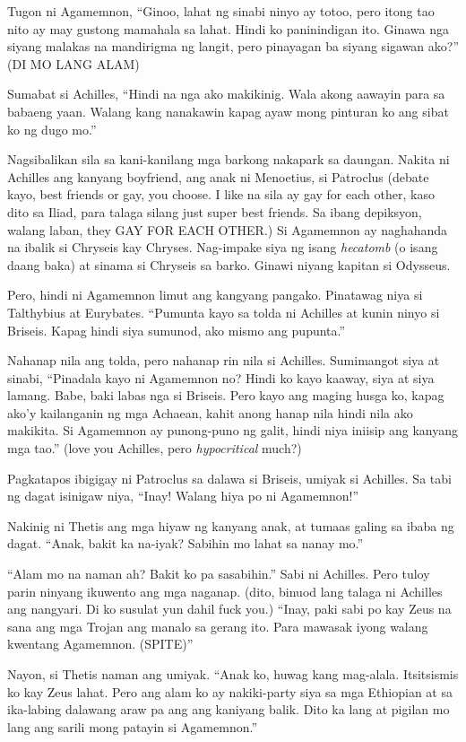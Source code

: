 \documentclass[12pt,letterpaper]{report}
\begin{document}
Tugon ni Agamemnon, ``Ginoo, lahat ng sinabi ninyo ay totoo, pero itong tao nito ay may gustong mamahala sa lahat. Hindi ko paninindigan ito. Ginawa nga siyang malakas na mandirigma ng langit, pero pinayagan ba siyang sigawan ako?'' (DI MO LANG ALAM)

Sumabat si Achilles, ``Hindi na nga ako makikinig. Wala akong aawayin para sa babaeng yaan. Walang kang nanakawin kapag ayaw mong pinturan ko ang sibat ko ng dugo mo.''

Nagsibalikan sila sa kani-kanilang mga barkong nakapark sa daungan. Nakita ni Achilles ang kanyang boyfriend, ang anak ni Menoetius, si Patroclus (debate kayo, best friends or gay, you choose. I like na sila ay gay for each other, kaso dito sa Iliad, para talaga silang just super best friends. Sa ibang depiksyon, walang laban, they GAY FOR EACH OTHER.) Si Agamemnon ay naghahanda na ibalik si Chryseis kay Chryses. Nag-impake siya ng isang \textit{hecatomb} (o isang daang baka) at sinama si Chryseis sa barko. Ginawi niyang kapitan si Odysseus.

Pero, hindi ni Agamemnon limut  ang kangyang pangako. Pinatawag niya si Talthybius at Eurybates. ``Pumunta kayo sa tolda ni Achilles at kunin ninyo si Briseis. Kapag hindi siya sumunod, ako mismo ang pupunta.''

Nahanap nila ang tolda, pero nahanap rin nila si Achilles. Sumimangot siya at sinabi, ``Pinadala kayo ni Agamemnon no? Hindi ko kayo kaaway, siya at siya lamang. Babe, baki labas nga si Briseis. Pero kayo ang maging husga ko, kapag ako'y kailanganin ng mga Achaean, kahit anong hanap nila hindi nila ako makikita. Si Agamemnon ay punong-puno ng galit, hindi niya iniisip ang kanyang mga tao.'' (love you Achilles, pero \textit{hypocritical} much?)

Pagkatapos ibigigay ni Patroclus sa dalawa si Briseis, umiyak si Achilles. Sa tabi ng dagat isinigaw niya, ``Inay! Walang hiya po ni Agamemnon!''

Nakinig ni Thetis ang mga hiyaw ng kanyang anak, at tumaas galing sa ibaba ng dagat. ``Anak, bakit ka na-iyak? Sabihin mo lahat sa nanay mo.''

``Alam mo na naman ah? Bakit ko pa sasabihin.'' Sabi ni Achilles. Pero tuloy parin ninyang ikuwento ang mga naganap. (dito, binuod lang talaga ni Achilles ang nangyari. Di ko susulat yun dahil fuck you.) ``Inay, paki sabi po kay Zeus na sana ang mga Trojan ang manalo sa gerang ito. Para mawasak iyong walang kwentang Agamemnon. (SPITE)''

Nayon, si Thetis naman ang umiyak. ``Anak ko, huwag kang mag-alala. Itsitsismis ko kay Zeus lahat. Pero ang alam ko ay nakiki-party siya sa mga Ethiopian at sa ika-labing dalawang araw pa ang ang kaniyang balik. Dito ka lang at pigilan mo lang ang sarili mong patayin si Agamemnon.''
\end{document}
